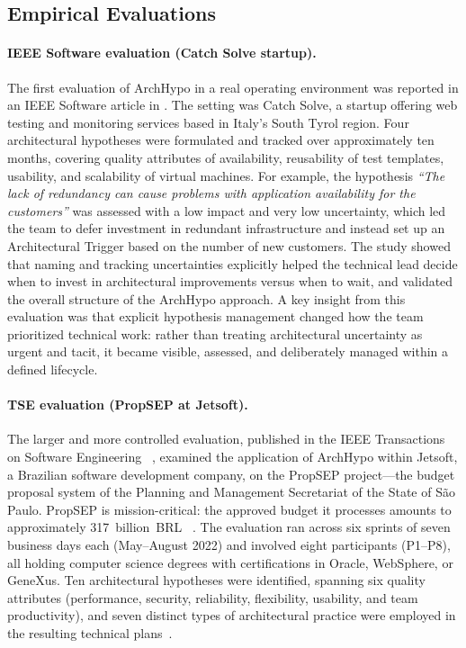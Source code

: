 \subsection{Empirical Evaluations}
\label{subsec:archhypo-evaluations}

\paragraph{IEEE Software evaluation (Catch Solve startup).}
The first evaluation of ArchHypo in a real operating environment was reported in an
IEEE Software article in \citet{silva2024ieeesw}. The setting was Catch
Solve, a startup offering web testing and monitoring services based in Italy's South
Tyrol region. Four architectural hypotheses were formulated and
tracked over approximately ten months, covering quality attributes of availability,
reusability of test templates, usability, and scalability of virtual machines. For
example, the hypothesis \emph{``The lack of redundancy can cause problems with
application availability for the customers''} was assessed with a low impact and very
low uncertainty, which led the team to defer investment in redundant infrastructure and
instead set up an Architectural Trigger based on the number of new
customers. The study showed that naming and tracking
uncertainties explicitly helped the technical lead decide when to invest in architectural
improvements versus when to wait, and validated the overall structure of the ArchHypo
approach. A key insight from this evaluation was that explicit hypothesis management
changed how the team prioritized technical work: rather than treating architectural
uncertainty as urgent and tacit, it became visible, assessed, and deliberately managed
within a defined lifecycle.

\paragraph{TSE evaluation (PropSEP at Jetsoft).}
The larger and more controlled evaluation, published in the IEEE Transactions on
Software Engineering ~\citep{silva2024tse}, examined the application of ArchHypo within
Jetsoft, a Brazilian software development company, on the PropSEP project---the budget
proposal system of the Planning and Management Secretariat of the State of São Paulo.
PropSEP is mission-critical: the approved budget it processes amounts to approximately
317~billion~BRL ~\citep{silva2024tse}. The evaluation ran across six sprints of seven
business days each (May--August 2022) and involved eight participants (P1--P8), all
holding computer science degrees with certifications in Oracle, WebSphere, or GeneXus.
Ten architectural hypotheses were identified, spanning six quality attributes
(performance, security, reliability, flexibility, usability, and team productivity), and
seven distinct types of architectural practice were employed in the resulting technical
plans~\citep{silva2024tse}.

